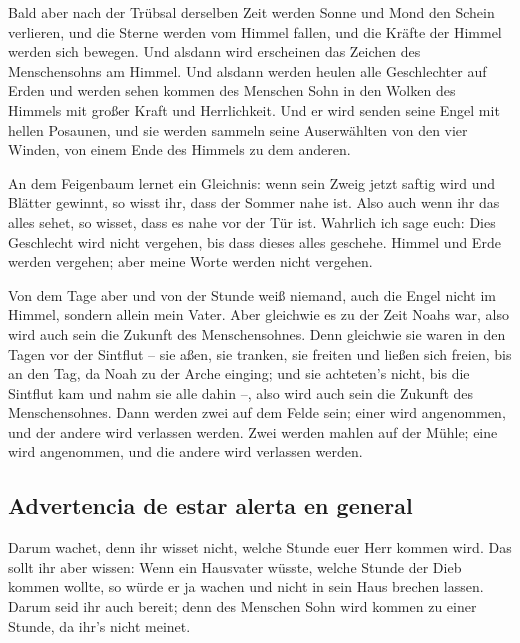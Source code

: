  Bald aber nach der Trübsal derselben Zeit werden Sonne
und Mond den Schein verlieren, und die Sterne werden vom Himmel fallen,
und die Kräfte der Himmel werden sich bewegen.  Und
alsdann wird erscheinen das Zeichen des Menschensohns am Himmel. Und
alsdann werden heulen alle Geschlechter auf Erden und werden sehen
kommen des Menschen Sohn in den Wolken des Himmels mit großer Kraft und
Herrlichkeit.  Und er wird senden seine Engel mit hellen
Posaunen, und sie werden sammeln seine Auserwählten von den vier Winden,
von einem Ende des Himmels zu dem anderen.

 An dem Feigenbaum lernet ein Gleichnis: wenn sein Zweig
jetzt saftig wird und Blätter gewinnt, so wisst ihr, dass der Sommer
nahe ist.  Also auch wenn ihr das alles sehet, so wisset,
dass es nahe vor der Tür ist.  Wahrlich ich sage euch:
Dies Geschlecht wird nicht vergehen, bis dass dieses alles geschehe.
 Himmel und Erde werden vergehen; aber meine Worte werden
nicht vergehen.

 Von dem Tage aber und von der Stunde weiß niemand, auch
die Engel nicht im Himmel, sondern allein mein Vater. 
Aber gleichwie es zu der Zeit Noahs war, also wird auch sein die Zukunft
des Menschensohnes.  Denn gleichwie sie waren in den
Tagen vor der Sintflut -- sie aßen, sie tranken, sie freiten und ließen
sich freien, bis an den Tag, da Noah zu der Arche einging;
 und sie achteten's nicht, bis die Sintflut kam und nahm
sie alle dahin --, also wird auch sein die Zukunft des Menschensohnes.
 Dann werden zwei auf dem Felde sein; einer wird
angenommen, und der andere wird verlassen werden.  Zwei
werden mahlen auf der Mühle; eine wird angenommen, und die andere wird
verlassen werden.

\hypertarget{advertencia-de-estar-alerta-en-general}{%
\subsection{Advertencia de estar alerta en
general}\label{advertencia-de-estar-alerta-en-general}}

 Darum wachet, denn ihr wisset nicht, welche Stunde euer
Herr kommen wird.  Das sollt ihr aber wissen: Wenn ein
Hausvater wüsste, welche Stunde der Dieb kommen wollte, so würde er ja
wachen und nicht in sein Haus brechen lassen.  Darum seid
ihr auch bereit; denn des Menschen Sohn wird kommen zu einer Stunde, da
ihr's nicht meinet.

